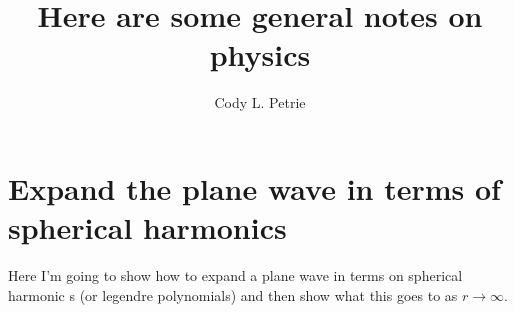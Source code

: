 \documentclass[12pt]{extarticle}
\title{Here are some general notes on physics}
\author{Cody L. Petrie}
\begin{document}
\maketitle

\tableofcontents

\section{Expand the plane wave in terms of spherical harmonics}
Here I'm going to show how to expand a plane wave in terms on spherical harmonic
s (or legendre polynomials) and then show what this goes to as $r \rightarrow \infty$.

\end{document}
